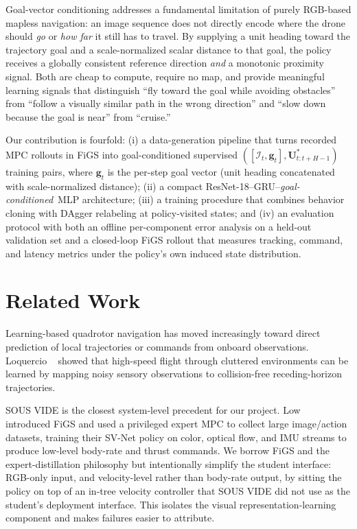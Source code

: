 \documentclass[10pt,twocolumn,letterpaper]{article}
\begin{document}
Goal-vector conditioning addresses a fundamental limitation of purely RGB-based mapless navigation: an image sequence does not directly encode where the drone should \emph{go} or \emph{how far} it still has to travel. By supplying a unit heading toward the trajectory goal and a scale-normalized scalar distance to that goal, the policy receives a globally consistent reference direction \emph{and} a monotonic proximity signal. Both are cheap to compute, require no map, and provide meaningful learning signals that distinguish ``fly toward the goal while avoiding obstacles'' from ``follow a visually similar path in the wrong direction'' and ``slow down because the goal is near'' from ``cruise.''

Our contribution is fourfold: (i) a data-generation pipeline that turns recorded MPC rollouts in FiGS into goal-conditioned supervised $([\mathcal{I}_t,\mathbf{g}_t], \mathbf{U}^{*}_{t:t+H-1})$ training pairs, where $\mathbf{g}_t$ is the per-step goal vector (unit heading concatenated with scale-normalized distance); (ii) a compact ResNet-18--GRU--\emph{goal-conditioned}~MLP architecture; (iii) a training procedure that combines behavior cloning with DAgger relabeling at policy-visited states; and (iv) an evaluation protocol with both an offline per-component error analysis on a held-out validation set and a closed-loop FiGS rollout that measures tracking, command, and latency metrics under the policy's own induced state distribution.

\section{Related Work}
\label{sec:related}

Learning-based quadrotor navigation has moved increasingly toward direct prediction of local trajectories or commands from onboard observations. Loquercio \etal~\cite{loquercio2021learning} showed that high-speed flight through cluttered environments can be learned by mapping noisy sensory observations to collision-free receding-horizon trajectories.

SOUS VIDE is the closest system-level precedent for our project. Low \etal~\cite{low2024sousvide} introduced FiGS and used a privileged expert MPC to collect large image/action datasets, training their SV-Net policy on color, optical flow, and IMU streams to produce low-level body-rate and thrust commands. We borrow FiGS and the expert-distillation philosophy but intentionally simplify the student interface: RGB-only input, and velocity-level rather than body-rate output, by sitting the policy on top of an in-tree velocity controller that SOUS VIDE did not use as the student's deployment interface. This isolates the visual representation-learning component and makes failures easier to attribute.
\end{document}
